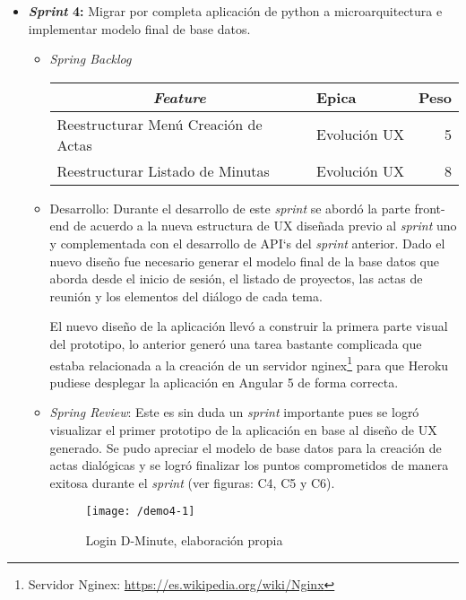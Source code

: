 \begin{itemize}
\begin{itemize}
\end{itemize}


	\item \textbf{\textit{Sprint} 4:} Migrar por completa aplicación de python a microarquitectura e implementar modelo final de base datos. 

\begin{itemize}
\item \textit{Spring Backlog}

\begin{table}[!h]
\centering
\label{tab:backlog4}
\begin{tabular}{|l|l|r|}
\hline
\multicolumn{1}{|c|}{\textit{\textbf{Feature}}} & \textbf{Epica} & \textbf{Peso} \\ \hline
Reestructurar Menú Creación de Actas & Evolución UX & 5 \\ \hline
Reestructurar Listado de Minutas & Evolución UX & 8 \\ \hline
\end{tabular}
\end{table}

\item Desarrollo: Durante el desarrollo de este \textit{sprint} se abordó la parte front-end de acuerdo a la nueva estructura de UX diseñada previo al \textit{sprint} uno y complementada con el desarrollo de API`s del \textit{sprint} anterior. Dado el nuevo diseño fue necesario generar el modelo final de la base datos que aborda desde el inicio de sesión, el listado de proyectos, las actas de reunión y los elementos del diálogo de cada tema. 

El nuevo diseño de la aplicación llevó a construir la primera parte visual del prototipo, lo anterior generó una tarea bastante complicada que estaba relacionada a la creación de un servidor nginex\footnote{Servidor Nginex: \url{https://es.wikipedia.org/wiki/Nginx}} para que Heroku pudiese desplegar la aplicación en Angular 5 de forma correcta.

\item \textit{Spring Review}: Este es sin duda un \textit{sprint} importante pues se logró visualizar el primer prototipo de la aplicación en base al diseño de UX generado. Se pudo apreciar el modelo de base datos para la creación de actas dialógicas y se logró finalizar los puntos comprometidos de manera exitosa durante el \textit{sprint} (ver figuras: C4, C5 y C6).

\begin{figure}[!h]
\centering
\texttt{[image: /demo4-1]}
\label{imga-c41}
\caption{Login D-Minute, elaboración propia}
\end{figure}


\end{itemize}
\end{itemize}
